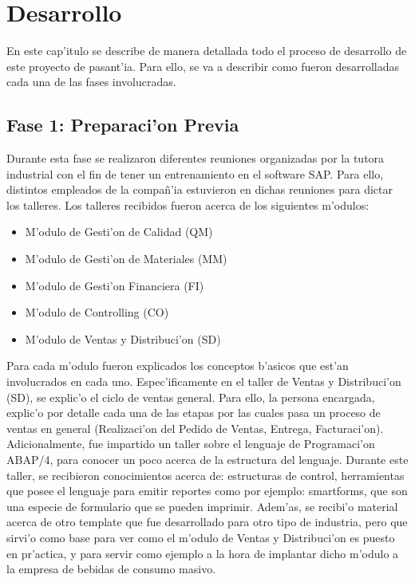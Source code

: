 \chapter{Desarrollo} \label{chap:desarrollo}
	En este cap'itulo se describe de manera detallada todo el proceso de desarrollo de este proyecto de pasant'ia. Para ello, se va a describir como fueron desarrolladas cada una de las fases involucradas.

\section{Fase 1: Preparaci'on Previa}
	Durante esta fase se realizaron diferentes reuniones organizadas por la tutora industrial con el fin de tener un entrenamiento en el software SAP. Para ello, distintos empleados de la compa\~n'ia estuvieron en dichas reuniones para dictar los talleres.
\newline
\newline
	Los talleres recibidos fueron acerca de los siguientes m'odulos:
\begin{itemize}
\item M'odulo de Gesti'on de Calidad (QM)
\item M'odulo de Gesti'on de Materiales (MM)
\item M'odulo de Gesti'on Financiera (FI)
\item M'odulo de Controlling (CO)
\item M'odulo de Ventas y Distribuci'on (SD)
\end{itemize}
\indent Para cada m'odulo fueron explicados los conceptos b'asicos que est'an involucrados en cada uno. Espec'ificamente en el taller de Ventas y Distribuci'on (SD), se explic'o el ciclo de ventas general. Para ello, la persona encargada, explic'o por detalle cada una de las etapas por las cuales pasa un proceso de ventas en general (Realizaci'on del Pedido de Ventas, Entrega, Facturaci'on). 
\newline
\newline
\indent Adicionalmente, fue impartido un taller sobre el lenguaje de Programaci'on ABAP/4, para conocer un poco acerca de la estructura del lenguaje. Durante este taller, se recibieron conocimientos acerca de: estructuras de control, herramientas que posee el lenguaje para emitir reportes como por ejemplo: smartforms, que son una especie de formulario que se pueden imprimir. 
\newline
\newline
\indent Adem'as, se recibi'o material acerca de otro template que fue desarrollado para otro tipo de industria, pero que sirvi'o como base para ver como el m'odulo de Ventas y Distribuci'on es puesto en pr'actica, y para servir como ejemplo a la hora de implantar dicho m'odulo a la empresa de bebidas de consumo masivo.
	

